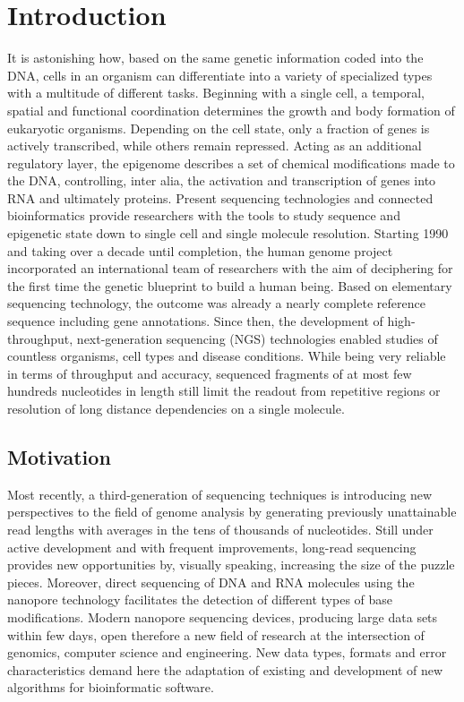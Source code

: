 \chapter{Introduction}
\label{cha:intro}

It is astonishing how, based on the same genetic information coded into the DNA, cells in an organism can differentiate into a variety of specialized types with a multitude of different tasks.
Beginning with a single cell, a temporal, spatial and functional coordination determines the growth and body formation of eukaryotic organisms.
Depending on the cell state, only a fraction of genes is actively transcribed, while others remain repressed.
Acting as an additional regulatory layer, the epigenome describes a set of chemical modifications made to the DNA, controlling, inter alia, the activation and transcription of genes into RNA and ultimately proteins.
Present sequencing technologies and connected bioinformatics provide researchers with the tools to study sequence and epigenetic state down to single cell and single molecule resolution.
Starting 1990 and taking over a decade until completion, the human genome project incorporated an international team of researchers with the aim of deciphering for the first time the genetic blueprint to build a human being. 
Based on elementary sequencing technology, the outcome was already a nearly complete reference sequence including gene annotations.
Since then, the development of high-throughput, next-generation sequencing (NGS) technologies enabled studies of countless organisms, cell types and disease conditions. 
While being very reliable in terms of throughput and accuracy, sequenced fragments of at most few hundreds nucleotides in length still limit the readout from repetitive regions or resolution of long distance dependencies on a single molecule.




\section{Motivation}
\label{sec:intro:motivation}

Most recently, a third-generation of sequencing techniques is introducing new perspectives to the field of genome analysis by generating previously unattainable read lengths with averages in the tens of thousands of nucleotides. 
Still under active development and with frequent improvements, long-read sequencing provides new opportunities by, visually speaking, increasing the size of the puzzle pieces.
Moreover, direct sequencing of DNA and RNA molecules using the nanopore technology facilitates the detection of different types of base modifications.
Modern nanopore sequencing devices, producing large data sets within few days, open therefore a new field of research at the intersection of genomics, computer science and engineering. 
New data types, formats and error characteristics demand here the adaptation of existing and development of new algorithms for bioinformatic software.




